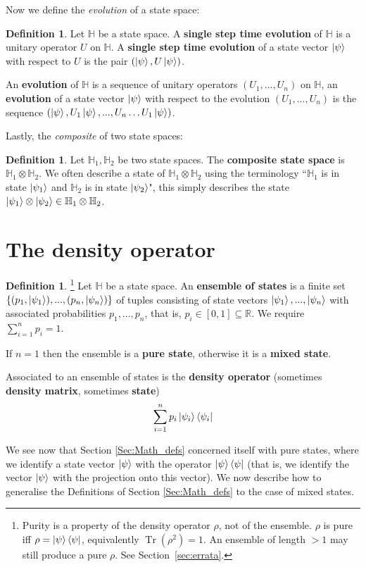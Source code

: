 \documentclass[12pt]{article}
\theoremstyle{plain}
\theoremstyle{definition}
\newtheorem{defn}[thm]{Definition} %
\newcommand{\bb}[1]{\mathbb{#1}}
\begin{document}
Now we define the \emph{evolution} of a state space:
\begin{defn}\label{def:time_evolution}
Let $\bb{H}$ be a state space. A \textbf{single step time evolution} of $\bb{H}$ is a unitary operator $U$ on $\bb{H}$. A \textbf{single step time evolution} of a state vector $\ket{\psi}$ with respect to $U$ is the pair $(\ket{\psi},U\ket{\psi})$.

An \textbf{evolution} of $\bb{H}$ is a sequence of unitary operators $(U_1,...,U_n)$ on $\bb{H}$, an \textbf{evolution} of a state vector $\ket{\psi}$ with respect to the evolution $(U_1,...,U_n)$ is the sequence $(\ket{\psi},U_1\ket{\psi},...,U_n\hdots U_1\ket{\psi})$.
\end{defn}
Lastly, the \emph{composite} of two state spaces:
\begin{defn}\label{def:composite_system}
Let $\bb{H}_1,\bb{H}_2$ be two state spaces. The \textbf{composite state space} is $\bb{H}_1 \otimes \bb{H}_2$. We often describe a state of $\bb{H}_1 \otimes \bb{H}_2$ using the terminology ``$\bb{H}_1$ is in state $\ket{\psi_1}$ and $\bb{H}_2$ is in state $\ket{\psi_2}$", this simply describes the state $\ket{\psi_1} \otimes \ket{\psi_2} \in \bb{H}_1 \otimes \bb{H}_2$.
\end{defn}

\section{The density operator}
\begin{defn}\footnote{Purity is a property of the density operator $\rho$, not of the ensemble. $\rho$ is pure iff $\rho=\ket{\psi}\bra{\psi}$, equivalently $\operatorname{Tr}(\rho^2)=1$. An ensemble of length $>1$ may still produce a pure $\rho$. See Section~\ref{sec:errata}.}
Let $\bb{H}$ be a state space. An \textbf{ensemble of states} is a finite set $\lbrace (p_1,\ket{\psi_1}),...,(p_n,\ket{\psi_n})\rbrace$ of tuples consisting of state vectors $\ket{\psi_1},...,\ket{\psi_n}$ with associated probabilities $p_1,...,p_n$, that is, $p_i \in [0,1] \subseteq \bb{R}$. We require $\sum_{i = 1}^n p_i = 1$.

If $n = 1$ then the ensemble is a \textbf{pure state}, otherwise it is a \textbf{mixed state}.

Associated to an ensemble of states is the \textbf{density operator} (sometimes \textbf{density matrix}, sometimes \textbf{state})
\begin{equation}
\sum_{i = 1}^n p_i \ket{\psi_i}\bra{\psi_i}
\end{equation}
\end{defn}
We see now that Section \ref{Sec:Math_defs} concerned itself with pure states, where we identify a state vector $\ket{\psi}$ with the operator $\ket{\psi}\bra{\psi}$ (that is, we identify the vector $\ket{\psi}$ with the projection onto this vector). We now describe how to generalise the Definitions of Section \ref{Sec:Math_defs} to the case of mixed states.
\end{document}

